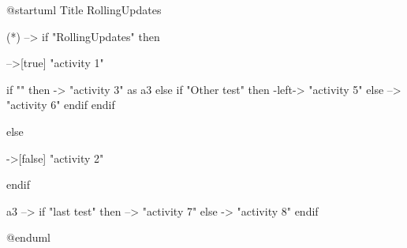 @startuml
Title RollingUpdates

(*) --> if "RollingUpdates" then

  -->[true] "activity 1"

  if "" then
    -> "activity 3" as a3
  else
    if "Other test" then
      -left-> "activity 5"
    else
      --> "activity 6"
    endif
  endif

else

  ->[false] "activity 2"

endif

a3 --> if "last test" then
  --> "activity 7"
else
  -> "activity 8"
endif

@enduml
